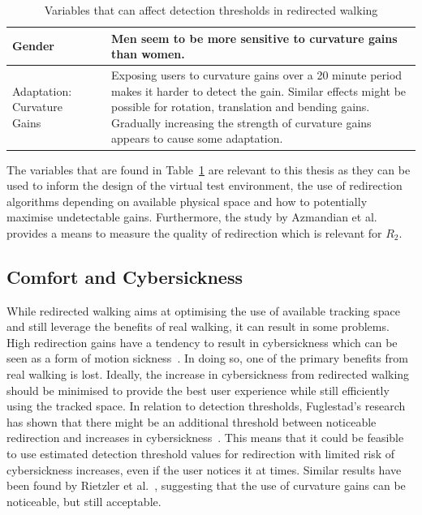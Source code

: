 \begin{table}[!h]
\begin{tabularx}{\textwidth}{|m{2cm}|m{1.7cm}|m{10.1cm}|}
\hline
Gender & \cite{nguyen2018individual} & Men seem to be more sensitive to curvature gains than women.\\
\hline
Adaptation: Curvature Gains & \cite{5072212, bolling2019shrinking, grechkin2016revisiting} & Exposing users to curvature gains over a 20 minute period makes it harder to detect the gain. Similar effects might be possible for rotation, translation and bending gains. Gradually increasing the strength of curvature gains appears to cause some adaptation.\\
\hline
\end{tabularx}
\caption{Variables that can affect detection thresholds in redirected walking}
\label{table:DTVariables}
\end{table}

The variables that are found in Table~\ref{table:DTVariables} are relevant to this thesis as they can be used to inform the design of the virtual test environment, the use of redirection algorithms depending on available physical space and how to potentially maximise undetectable gains. Furthermore, the study by Azmandian et al.~\cite{azmandian2015physical} provides a means to measure the quality of redirection which is relevant for $R_2$.

\subsection{Comfort and Cybersickness}
While redirected walking aims at optimising the use of available tracking space and still leverage the benefits of real walking, it can result in some problems. High redirection gains have a tendency to result in cybersickness which can be seen as a form of motion sickness~\cite{mousavi2013review}. In doing so, one of the primary benefits from real walking is lost. Ideally, the increase in cybersickness from redirected walking should be minimised to provide the best user experience while still efficiently using the tracked space. In relation to detection thresholds, Fuglestad's research has shown that there might be an additional threshold between noticeable redirection and increases in cybersickness~\cite{fuglestad2018redirected}. This means that it could be feasible to use estimated detection threshold values for redirection with limited risk of cybersickness increases, even if the user notices it at times. Similar results have been found by Rietzler et al.~\cite{rietzler2018rethinking}, suggesting that the use of curvature gains can be noticeable, but still acceptable. 


